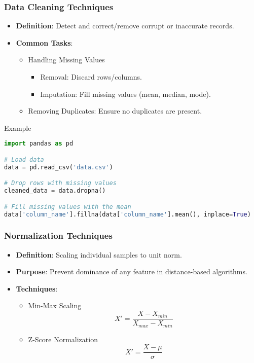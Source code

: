 \documentclass{beamer}
\begin{document}
\begin{frame}[fragile]
    \frametitle{Data Cleaning Techniques}
    \begin{itemize}
        \item \textbf{Definition}: Detect and correct/remove corrupt or inaccurate records.
        \item \textbf{Common Tasks}:
        \begin{itemize}
            \item Handling Missing Values
            \begin{itemize}
                \item Removal: Discard rows/columns.
                \item Imputation: Fill missing values (mean, median, mode).
            \end{itemize}
            \item Removing Duplicates: Ensure no duplicates are present.
        \end{itemize}
    \end{itemize}
    \begin{block}{Example}
    \begin{lstlisting}[language=Python]
import pandas as pd

# Load data
data = pd.read_csv('data.csv')

# Drop rows with missing values
cleaned_data = data.dropna()

# Fill missing values with the mean
data['column_name'].fillna(data['column_name'].mean(), inplace=True)
    \end{lstlisting}
    \end{block}
\end{frame}

\begin{frame}
    \frametitle{Normalization Techniques}
    \begin{itemize}
        \item \textbf{Definition}: Scaling individual samples to unit norm.
        \item \textbf{Purpose}: Prevent dominance of any feature in distance-based algorithms.
        \item \textbf{Techniques}:
        \begin{itemize}
            \item Min-Max Scaling
            \begin{equation}
            X' = \frac{X - X_{min}}{X_{max} - X_{min}}
            \end{equation}
            \item Z-Score Normalization
            \begin{equation}
            X' = \frac{X - \mu}{\sigma}
            \end{equation}
        \end{itemize}
    \end{itemize}
\end{frame}
\end{document}

